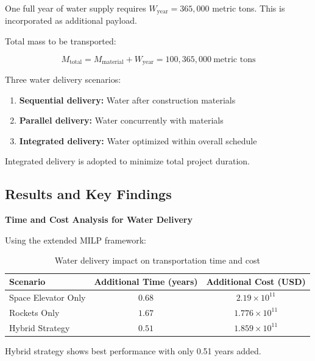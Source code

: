 \documentclass[12pt]{mcmthesis}
\begin{document}
One full year of water supply requires $W_{\text{year}} = 365,000$ metric tons. This is incorporated as additional payload.

Total mass to be transported:

\vspace{-10pt}
\[
    M_{\text{total}} = M_{\text{material}} + W_{\text{year}} = 100,365,000\ \text{metric tons}
\]
\vspace{-10pt}

Three water delivery scenarios:
\begin{enumerate}
    \item \textbf{Sequential delivery:} Water after construction materials
    \item \textbf{Parallel delivery:} Water concurrently with materials
    \item \textbf{Integrated delivery:} Water optimized within overall schedule
\end{enumerate}

Integrated delivery is adopted to minimize total project duration.

\subsection{Results and Key Findings}

\textbf{Time and Cost Analysis for Water Delivery}

Using the extended MILP framework:

\begin{table}[htbp]
    \centering
    \caption{Water delivery impact on transportation time and cost}
    \label{tab:water_delivery}
    \begin{tabular}{lcc}
        \toprule
        \textbf{Scenario}   & \textbf{Additional Time (years)} & \textbf{Additional Cost (USD)} \\
        \midrule
        Space Elevator Only & $0.68$                           & $2.19 \times 10^{11}$          \\
        Rockets Only        & $1.67$                           & $1.776 \times 10^{11}$         \\
        Hybrid Strategy     & $0.51$                           & $1.859 \times 10^{11}$         \\
        \bottomrule
    \end{tabular}
\end{table}

Hybrid strategy shows best performance with only 0.51 years added.
\end{document}
